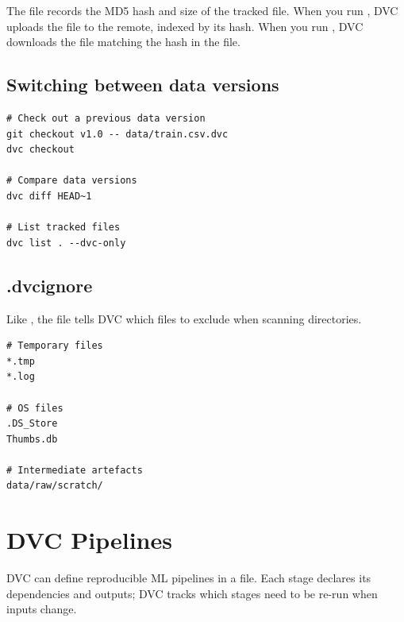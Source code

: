 The  file records the MD5 hash and size of the tracked file.
When you run , DVC uploads the file to the remote, indexed
by its hash. When you run , DVC downloads the file matching
the hash in the  file.

\subsection{Switching between data versions}

\begin{codeblock}[title=\textbf{Time-travelling through data versions}]
\begin{verbatim}
# Check out a previous data version
git checkout v1.0 -- data/train.csv.dvc
dvc checkout

# Compare data versions
dvc diff HEAD~1

# List tracked files
dvc list . --dvc-only
\end{verbatim}
\end{codeblock}

\subsection{.dvcignore}

Like , the  file tells DVC which files
to exclude when scanning directories.

\begin{codeblock}[title=\textbf{.dvcignore}]
\begin{verbatim}
# Temporary files
*.tmp
*.log

# OS files
.DS_Store
Thumbs.db

# Intermediate artefacts
data/raw/scratch/
\end{verbatim}
\end{codeblock}

\section{DVC Pipelines}
\label{sec:dvc-pipelines}

DVC can define reproducible ML pipelines in a  file.
Each stage declares its dependencies and outputs; DVC tracks which stages
need to be re-run when inputs change.

